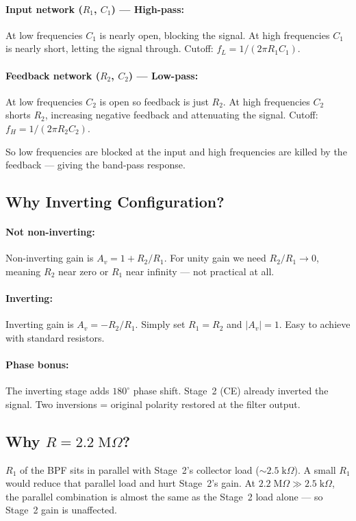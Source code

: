 \documentclass[10pt,twocolumn]{article}
\begin{document}
\paragraph{Input network ($R_1$, $C_1$) — High-pass:}
At low frequencies $C_1$ is nearly open, blocking the signal.
At high frequencies $C_1$ is nearly short, letting the signal through.
Cutoff: $f_L = 1/(2\pi R_1 C_1)$.

\paragraph{Feedback network ($R_2$, $C_2$) — Low-pass:}
At low frequencies $C_2$ is open so feedback is just $R_2$.
At high frequencies $C_2$ shorts $R_2$, increasing negative feedback and attenuating the signal.
Cutoff: $f_H = 1/(2\pi R_2 C_2)$.

So low frequencies are blocked at the input and high frequencies are killed by the feedback — giving the band-pass response.

\subsection{Why Inverting Configuration?}

\paragraph{Not non-inverting:}
Non-inverting gain is $A_v = 1 + R_2/R_1$. For unity gain we need $R_2/R_1 \to 0$,
meaning $R_2$ near zero or $R_1$ near infinity — not practical at all.

\paragraph{Inverting:}
Inverting gain is $A_v = -R_2/R_1$. Simply set $R_1 = R_2$ and $|A_v| = 1$.
Easy to achieve with standard resistors.

\paragraph{Phase bonus:}
The inverting stage adds $180^{\circ}$ phase shift. Stage~2 (CE) already inverted the signal.
Two inversions = original polarity restored at the filter output.

\subsection{Why $R = 2.2\;\text{M}\Omega$?}
$R_1$ of the BPF sits in parallel with Stage~2's collector load ($\sim 2.5\;\text{k}\Omega$).
A small $R_1$ would reduce that parallel load and hurt Stage~2's gain.
At $2.2\;\text{M}\Omega \gg 2.5\;\text{k}\Omega$, the parallel combination is almost the same
as the Stage~2 load alone — so Stage~2 gain is unaffected.
\end{document}
